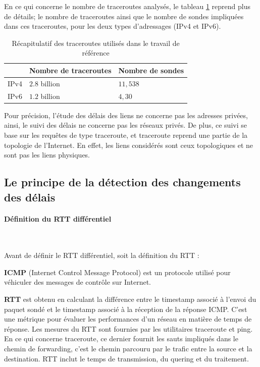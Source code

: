 En ce qui concerne le nombre de  traceroutes analysés, le tableau \ref{tab:dataset} reprend plus de détails; le nombre de traceroutes ainsi que le nombre de sondes impliquées dans ces traceroutes, pour les deux types d'adressages (IPv4 et IPv6). 

\begin{table}[H]
	\centering
	\begin{tabular}{|l|l|l|}
		\hline
		& \textbf{Nombre de traceroute}s& \textbf{Nombre de sondes}\\ \hline
		IPv4		&$ 2.8 $ billion & $ 11,538 $\\ \hline
		IPv6	&	$ 1.2 $ billion & $ 4,30 $ \\ \hline
	\end{tabular}
	\caption{Récapitulatif des traceroutes utilisés dans le travail de référence }
	\label{tab:dataset}
\end{table}


Pour précision, l'étude des délais des liens ne concerne pas  les adresses privées, ainsi, le suivi des délais ne concerne pas les réseaux privés.  De plus, ce  suivi  se base sur les requêtes de type traceroute, et traceroute reprend une partie de la topologie de l'Internet. En effet, les liens considérés sont ceux topologiques et ne sont pas  les liens physiques. 

\subsection{Le principe de la détection des changements des délais} \label{principe-de-detection}
\paragraph{Définition du RTT différentiel }~

Avant de définir le RTT différentiel, soit la définition du RTT :


\begin{tcolorbox}
	
	\textbf{ICMP} (Internet Control Message Protocol) est un protocole utilisé pour véhiculer des messages de contrôle sur Internet.
	
	\textbf{RTT} est obtenu en calculant la différence entre le timestamp associé à l'envoi du paquet sondé  et le timestamp associé à la réception de la réponse ICMP. C'est une métrique pour évaluer les performances d'un réseau en matière de temps de réponse. Les mesures du RTT sont fournies par les utilitaires traceroute et ping. En ce qui concerne traceroute,  ce dernier fournit les sauts impliqués dans le  chemin de forwarding, c'est le chemin parcouru par le trafic entre la source et la destination.  RTT inclut le temps de transmission, du quering et  du traitement. 
\end{tcolorbox}

